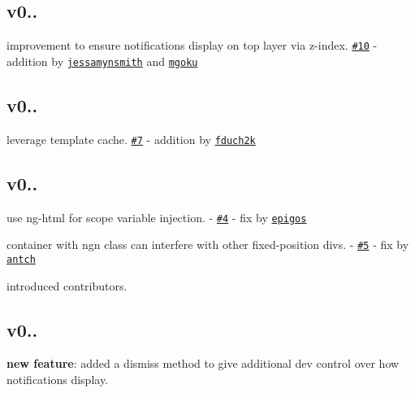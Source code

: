 \subsection*{v0..}


\begin{DoxyItemize}
\item improvement to ensure notifications display on top layer via z-\/index. \href{https://github.com/matowens/ng-notify/pull/10}{\tt \#10} -\/ addition by \href{https://github.com/jessamynsmith}{\tt jessamynsmith} and \href{https://github.com/mgoku}{\tt mgoku}
\end{DoxyItemize}

\subsection*{v0..}


\begin{DoxyItemize}
\item leverage template cache. \href{https://github.com/matowens/ng-notify/pull/7}{\tt \#7} -\/ addition by \href{https://github.com/fduch2k}{\tt fduch2k}
\end{DoxyItemize}

\subsection*{v0..}


\begin{DoxyItemize}
\item use ng-\/html for scope variable injection. -\/ \href{https://github.com/matowens/ng-notify/pull/4}{\tt \#4} -\/ fix by \href{https://github.com/epigos}{\tt epigos}
\item container with {\ttfamily ngn} class can interfere with other fixed-\/position divs. -\/ \href{https://github.com/matowens/ng-notify/issues/5}{\tt \#5} -\/ fix by \href{https://github.com/antch}{\tt antch}
\item introduced contributors.
\end{DoxyItemize}

\subsection*{v0..}


\begin{DoxyItemize}
\item {\bfseries new feature}\+: added a dismiss method to give additional dev control over how notifications display.
\end{DoxyItemize}

